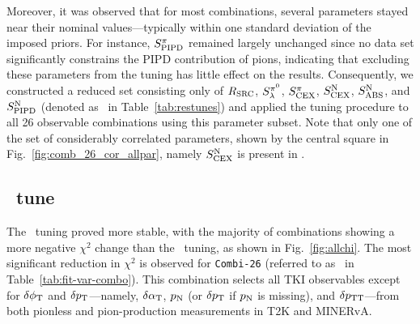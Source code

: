     Moreover, it was observed that for most combinations, several parameters stayed near their nominal values—typically within one standard deviation of the imposed priors. 
    For instance, $S_\textrm{PIPD}^{\pi}$ remained largely unchanged since no data set significantly constrains the PIPD contribution of pions, indicating that excluding these parameters from the tuning has little effect on the results.
    Consequently, we constructed a reduced set consisting only of $R_\textrm{SRC}$, $S_\lambda^{\pi^{0}}$, $S_\textrm{CEX}^{\pi}$, $S_\textrm{CEX}^\textrm{N}$, $S_\textrm{ABS}^\textrm{N}$, and $S_\textrm{PIPD}^\textrm{N}$ (denoted as \redpar\ in Table~\ref{tab:restunes}) and applied the tuning procedure to all 26 observable combinations using this parameter subset.
    Note that only one of the set of considerably correlated parameters, shown by the central square in Fig.~\ref{fig:comb_26_cor_allpar}, namely $S_\textrm{CEX}^\textrm{N}$ is present in \redpar. 


    \subsection{\redpar\ tune}
    The \redpar\ tuning proved more stable, with the majority of combinations showing a more negative $\chi^2$ change than the \allpar\ tuning, as shown in Fig.~\ref{fig:allchi}. 
    The most significant reduction in $\chi^2$ is observed for \texttt{Combi-26} (referred to as \cbRedPar\ in Table~\ref{tab:fit-var-combo}). 
    This combination selects all TKI observables except for $\delta\phi_\textrm{T}$ and $\delta p_\textrm{T}$—namely, $\delta\alpha_\textrm{T}$, $p_\textrm{N}$ (or $\delta p_\textrm{T}$ if $p_\textrm{N}$ is missing), and $\delta p_\textrm{TT}$—from both pionless and pion-production measurements in T2K and MINERvA.

